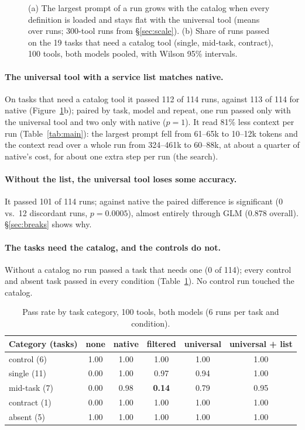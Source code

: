 \begin{figure}[t]
\centering
\resizebox{\linewidth}{!}{}
\caption{(a) The largest prompt of a run grows with the catalog when every definition is loaded and stays flat
with the universal tool (means over runs; 300-tool runs from \S\ref{sec:scale}). (b) Share of runs passed on
the 19 tasks that need a catalog tool (single, mid-task, contract), 100 tools, both models pooled, with
Wilson 95\% intervals.}
\label{fig:harness}
\end{figure}

\paragraph{The universal tool with a service list matches native.} On tasks that need a catalog tool it passed
112 of 114 runs, against 113 of 114 for native (Figure~\ref{fig:harness}b); paired by task, model and repeat,
one run passed only with the universal tool and two only with native ($p=1$). It read 81\% less context per
run (Table~\ref{tab:main}): the largest prompt fell from 61--65k to 10--12k tokens and the context read over a
whole run from 324--461k to 60--88k, at about a quarter of native's cost, for about one extra step per run (the
search).

\paragraph{Without the list, the universal tool loses some accuracy.} It passed 101 of 114 runs; against native
the paired difference is significant (0 vs.\ 12 discordant runs, $p=0.0005$), almost entirely through GLM
(0.878 overall). \S\ref{sec:breaks} shows why.

\paragraph{The tasks need the catalog, and the controls do not.} Without a catalog no run passed a task that
needs one (0 of 114); every control and absent task passed in every condition (Table~\ref{tab:cats}). No
control run touched the catalog.

\begin{table}[t]
\centering\small
\caption{Pass rate by task category, 100 tools, both models (6 runs per task and condition).}
\label{tab:cats}
\begin{tabular}{@{}lccccc@{}}
\toprule
Category (tasks) & none & native & filtered & universal & universal + list \\
\midrule
control (6) & 1.00 & 1.00 & 1.00 & 1.00 & 1.00 \\
single (11) & 0.00 & 1.00 & 0.97 & 0.94 & 1.00 \\
mid-task (7) & 0.00 & 0.98 & \textbf{0.14} & 0.79 & 0.95 \\
contract (1) & 0.00 & 1.00 & 1.00 & 1.00 & 1.00 \\
absent (5) & 1.00 & 1.00 & 1.00 & 1.00 & 1.00 \\
\bottomrule
\end{tabular}
\end{table}

